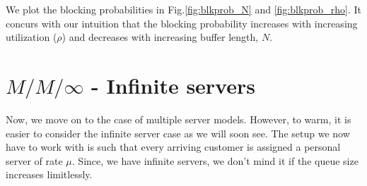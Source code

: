 \documentclass[11pt, a4paper]{report}
\begin{document}
We plot the blocking probabilities in Fig.\ref{fig:blkprob_N} and \ref{fig:blkprob_rho}. It concurs with our intuition that the blocking probability increases with increasing utilization ($\rho$) and decreases with increasing buffer length, $N$.

\section{$M/M/\infty$ - Infinite servers}

Now, we move on to the case of multiple server models. However, to warm, it is easier to consider the infinite server case as we will soon see. The setup we now have to work with is such that every arriving customer is assigned a personal server of rate $\mu$. Since, we have infinite servers, we don't mind it if the queue size increases limitlessly. 
\end{document}
